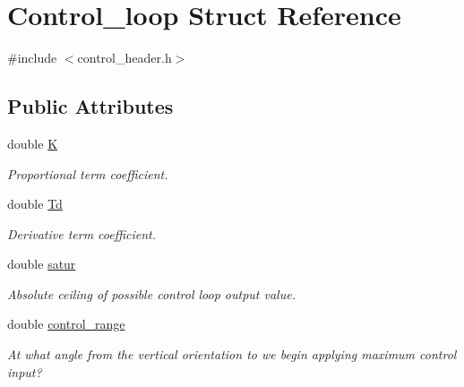 \hypertarget{structControl__loop}{\section{Control\-\_\-loop Struct Reference}
\label{structControl__loop}
}


{\ttfamily \#include $<$control\-\_\-header.\-h$>$}

\subsection*{Public Attributes}
\begin{DoxyCompactItemize}
\item 
\hypertarget{structControl__loop_ac3aed43dcaf03d086e69ab794f1959f4}{double \hyperlink{structControl__loop_ac3aed43dcaf03d086e69ab794f1959f4}{K}}\label{structControl__loop_ac3aed43dcaf03d086e69ab794f1959f4}

\begin{DoxyCompactList}\small\item\em Proportional term coefficient. \end{DoxyCompactList}\item 
\hypertarget{structControl__loop_aba5fcbc8e5511269f9f53763ceb8e6dd}{double \hyperlink{structControl__loop_aba5fcbc8e5511269f9f53763ceb8e6dd}{Td}}\label{structControl__loop_aba5fcbc8e5511269f9f53763ceb8e6dd}

\begin{DoxyCompactList}\small\item\em Derivative term coefficient. \end{DoxyCompactList}\item 
\hypertarget{structControl__loop_a90ed943640ce57e399c42de9d994a55c}{double \hyperlink{structControl__loop_a90ed943640ce57e399c42de9d994a55c}{satur}}\label{structControl__loop_a90ed943640ce57e399c42de9d994a55c}

\begin{DoxyCompactList}\small\item\em Absolute ceiling of possible control loop output value. \end{DoxyCompactList}\item 
\hypertarget{structControl__loop_a356d69d54de1f56c81ebd3fa7f68ddc6}{double \hyperlink{structControl__loop_a356d69d54de1f56c81ebd3fa7f68ddc6}{control\-\_\-range}}\label{structControl__loop_a356d69d54de1f56c81ebd3fa7f68ddc6}

\begin{DoxyCompactList}\small\item\em At what angle from the vertical orientation to we begin applying maximum control input? \end{DoxyCompactList}\end{DoxyCompactItemize}


